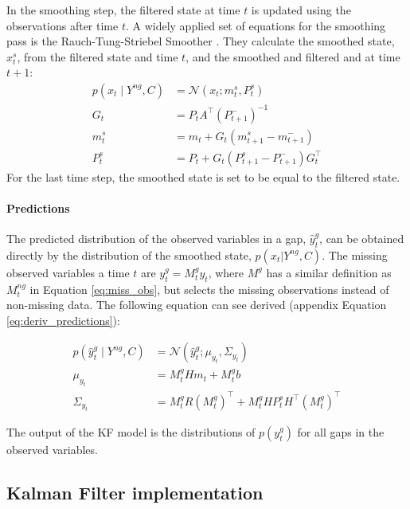 \documentclass{article}
\newcommand{\norm}[3]{\mathcal{N}\left(#1; #2, #3\right)} %
\let\Oldsubsection\subsection
\renewcommand{\subsection}{\FloatBarrier\Oldsubsection}
\begin{document}
In the smoothing step, the filtered state at time $t$ is updated using the observations after time $t$. A widely applied set of equations for the smoothing pass is the Rauch-Tung-Striebel Smoother \cite{rauch_maximum_1965}. They calculate the smoothed state, $x_t^s$, from the filtered state and time $t$, and the smoothed and filtered and at time $t+1$:
\begin{equation}
\begin{aligned}\label{eq:smoother}
    p(x_t \mid Y^{ng}, C) &= \norm{x_t}{m_t^s}{P_t^s} \\
    G_t &= P_tA^\top(P_{t+1}^-)^{-1}\\
    m_t^s &= m_t + G_t(m_{t+1}^s - m_{t+1}^-) \\
    P_t^s &= P_t + G_t(P_{t+1}^s - P_{t+1}^-)G_t^\top
\end{aligned}
\end{equation}
For the last time step, the smoothed state is set to be equal to the filtered state.

\paragraph{Predictions} The predicted distribution of the observed variables in a gap, $\hat{y}^g_t$, can be obtained directly by the distribution of the smoothed state, $p(x_t | Y^{ng}, C)$.
The missing observed variables a time $t$ are $y^g_t = M^g_ty_t$, where $M^{g}$ has a similar definition as $M^{ng}_t$ in Equation \ref{eq:miss_obs}, but selects the missing observations instead of non-missing data.
The following equation can see derived (appendix Equation \ref{eq:deriv_predictions}):

\begin{equation}
\begin{aligned}\label{eq:filter_predictions}
    p(\hat{y}^g_t \mid Y^{ng}, C) &= \norm{\hat{y}^g_t}{\mu_{y_t}}{\Sigma_{y_t}} \\
    \mu_{y_t} &= M^g_tHm_t + M^g_tb \\
    \Sigma_{y_t} &= M^g_tR(M^g_t)^\top + M^g_tHP^s_tH^\top (M^g_t)^\top
\end{aligned}
\end{equation}

The output of the KF model is the distributions of $p(y^g_t)$ for all gaps in the observed variables.

\subsection{Kalman Filter implementation}
\end{document}
